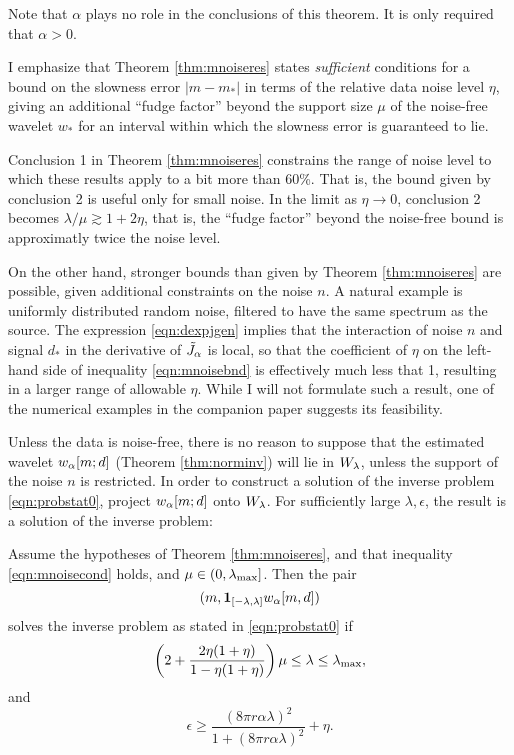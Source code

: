  Note that $\alpha$ plays no role in the
conclusions of this theorem. It is only required that $\alpha >0$.

 I emphasize that Theorem \ref{thm:mnoiseres} states {\em sufficient} conditions for a bound on
the slowness error $|m-m_*|$ in terms of the relative data noise level $\eta$,
giving an additional ``fudge factor'' beyond the support size $\mu$
of the noise-free wavelet $w_*$ for an interval within which the slowness error is
guaranteed to lie.

Conclusion 1 in Theorem \ref{thm:mnoiseres} constrains the range of
noise level to which these results apply to a bit more than 60\%. That
is, the bound given by conclusion 2 is useful only for small noise. In
the limit as $\eta \rightarrow 0$, conclusion 2 becomes
$\lambda/\mu \gtrsim 1 + 2\eta$, that is, the ``fudge factor'' beyond
the noise-free bound is approximatly twice the noise level.

On the other hand, stronger bounds than given by Theorem
\ref{thm:mnoiseres} are possible, given additional constraints on the
noise $n$. A natural example is uniformly distributed random noise,
filtered to have the same spectrum as the source. The expression
\ref{eqn:dexpjgen} implies that the interaction of noise $n$ and
signal $d_*$ in the derivative of $\tilde{J}_{\alpha}$ is local, so that the
coefficient of $\eta$ on the left-hand side of inequality
\ref{eqn:mnoisebnd} is effectively much less that 1, resulting in a
larger range of allowable $\eta$. While I will not formulate such a
result, one of the numerical examples in the companion paper
\cite[]{SymesChenMinkoff:21} suggests its feasibility.

Unless the data is noise-free, there is no reason to suppose that the
estimated wavelet $w_{\alpha}[m;d]$ (Theorem \ref{thm:norminv}) will lie in
$W_{\lambda}$, unless the support of the noise $n$ is restricted. In order
to construct a solution of the inverse problem \ref{eqn:probstat0}, 
project $w_{\alpha}[m;d]$ onto $W_{\lambda}$. For sufficiently large $\lambda,
\epsilon$, the result is a solution of the inverse problem:

\begin{theorem}
  \label{thm:ipnoisesuf}
  Assume the hypotheses of Theorem \ref{thm:mnoiseres}, and that
  inequality \ref{eqn:mnoisecond} holds, and $\mu \in
  (0,\lambda_{\rm max}]$. Then the pair
  \[
    (m,{\bf 1}_{[-\lambda,\lambda]}w_{\alpha}[m,d])
  \]
  solves the inverse problem as stated in \ref{eqn:probstat0} if
  \begin{equation}
    \label{eqn:ipnoiselam}
    \left( 2+\frac{2\eta(1+\eta)}{1-\eta(1+\eta)}\right)\mu \le \lambda
    \le \lambda_{\rm max}, 
  \end{equation}
  and
  \begin{equation}
    \label{eqn:ipnoiseeps}
    \epsilon \ge \frac{(8 \pi r \alpha\lambda)^2}{1 + (8 \pi r \alpha\lambda)^2}+\eta. 
  \end{equation}    
\end{theorem}

